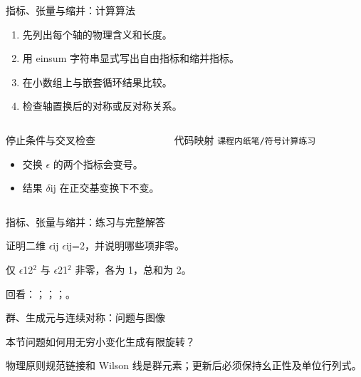 \begin{frame}[t]{指标、张量与缩并：计算算法}
\footnotesize
{}\begin{enumerate}
\item 先列出每个轴的物理含义和长度。
\item 用 einsum 字符串显式写出自由指标和缩并指标。
\item 在小数组上与嵌套循环结果比较。
\item 检查轴置换后的对称或反对称关系。
\end{enumerate}\begin{columns}[T,onlytextwidth]
\begin{block}{停止条件与交叉检查}\scriptsize\begin{itemize}
\item[\CheckMark] 交换 \ensuremath{\epsilon} 的两个指标会变号。
\item[\CheckMark] 结果 \ensuremath{\delta}ij 在正交基变换下不变。
\end{itemize}\end{block}
\begin{block}{代码映射}
\scriptsize \texttt{课程内纸笔/\allowbreak{}符号计算练习}
\end{block}\end{columns}\end{frame}

\begin{frame}[t]{指标、张量与缩并：练习与完整解答}
\footnotesize
\begin{block}{}证明二维 \ensuremath{\epsilon}ij \ensuremath{\epsilon}ij=2，并说明哪些项非零。\end{block}
\begin{exampleblock}{}仅 \ensuremath{\epsilon}12\ensuremath{^{2}} 与 \ensuremath{\epsilon}21\ensuremath{^{2}} 非零，各为 1，总和为 2。\end{exampleblock}
\vfill
\scriptsize 回看：；；；。
\end{frame}

\begin{frame}[t]{群、生成元与连续对称：问题与图像}
\footnotesize
\begin{block}{本节问题}如何用无穷小变化生成有限旋转？\end{block}
\begin{block}{物理原则}\quad 规范链接和 Wilson 线是群元素；更新后必须保持幺正性及单位行列式。\end{block}
\end{frame}

